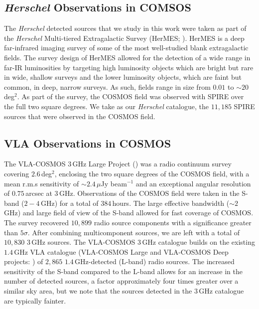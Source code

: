 \subsection{\textit{Herschel} Observations in COMSOS}

The \textit{Herschel} detected sources that we study in this work were taken as part of the \textit{Herschel} Multi-tiered Extragalactic Survey (HerMES; \citealt{Oliver_2012}). HerMES is a deep far-infrared imaging survey of some of the most well-studied blank extragalactic fields. The survey design of HerMES allowed for the detection of a wide range in far-IR luminosities by targeting high luminosity objects which are bright but rare in wide, shallow surveys and the lower luminosity objects, which are faint but common, in deep, narrow surveys. As such, fields range in size from $0.01$ to $\sim 20\,$deg$^2$. As part of the survey, the COSMOS field was observed with SPIRE over the full two square degrees. We take as our \textit{Herschel} catalogue, the $11,185$ SPIRE sources that were observed in the COSMOS field.

\subsection{VLA Observations in COSMOS}

The VLA-COSMOS $3\,$GHz Large Project (\citealt{Smolcic_2017a, Smolcic_2017b, Smolcic_2017c}) was a radio continuum survey covering $2.6\,$deg$^{2}$, enclosing the two square degrees of the COSMOS field, with a mean r.m.s sensitivity of $\sim 2.4\,\mu$Jy beam$^{-1}$ and an exceptional angular resolution of $0.75\,$arcsec at $3\,$GHz. Observations of the COSMOS field were taken in the S-band ($2 - 4\,$GHz) for a total of $384\,$hours. The large effective bandwidth ($\sim 2\,$GHz) and large field of view of the S-band allowed for fast coverage of COSMOS. The survey recovered $10,899$ radio source components with a significance greater than $5\sigma$. After combining multicomponent sources, we are left with a total of $10,830$ $3\,$GHz sources. The VLA-COSMOS $3\,$GHz catalogue builds on the existing $1.4\,$GHz VLA catalogue (VLA-COSMOS Large and VLA-COSMOS Deep projects: \citealt{Schinnerer_2004, Schinnerer_2007, Schinnerer_2010}) of $2,865$ $1.4\,$GHz-detected (L-band) radio sources. The increased sensitivity of the S-band compared to the L-band allows for an increase in the number of detected sources, a factor approximately four times greater over a similar sky area, but we note that the sources detected in the $3\,$GHz catalogue are typically fainter.

